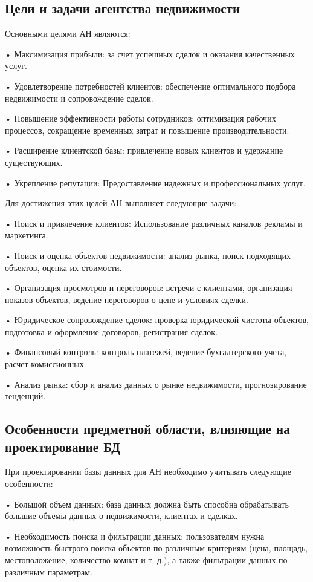 \subsection{Цели и задачи агентства недвижимости}

Основными целями АН являются:

•	Максимизация прибыли: за счет успешных сделок и оказания качественных услуг.

•	Удовлетворение потребностей клиентов: обеспечение оптимального подбора недвижимости и сопровождение сделок.

•	Повышение эффективности работы сотрудников: оптимизация рабочих процессов, сокращение временных затрат и повышение производительности.

•	Расширение клиентской базы: привлечение новых клиентов и удержание существующих.

•	Укрепление репутации: Предоставление надежных и профессиональных услуг.

Для достижения этих целей АН выполняет следующие задачи:

•	Поиск и привлечение клиентов: Использование различных каналов рекламы и маркетинга.

•	Поиск и оценка объектов недвижимости: анализ рынка, поиск подходящих объектов, оценка их стоимости.

•	Организация просмотров и переговоров: встречи с клиентами, организация показов объектов, ведение переговоров о цене и условиях сделки.

•	Юридическое сопровождение сделок: проверка юридической чистоты объектов, подготовка и оформление договоров, регистрация сделок.

•	Финансовый контроль: контроль платежей, ведение бухгалтерского учета, расчет комиссионных.

•	Анализ рынка: сбор и анализ данных о рынке недвижимости, прогнозирование тенденций.


\subsection{Особенности предметной области, влияющие на проектирование БД}

При проектировании базы данных для АН необходимо учитывать следующие особенности:

•	Большой объем данных: база данных должна быть способна обрабатывать большие объемы данных о недвижимости, клиентах и сделках.

•	Необходимость поиска и фильтрации данных: пользователям нужна возможность быстрого поиска объектов по различным критериям (цена, площадь, местоположение, количество комнат и т. д.), а также фильтрации данных по различным параметрам.

